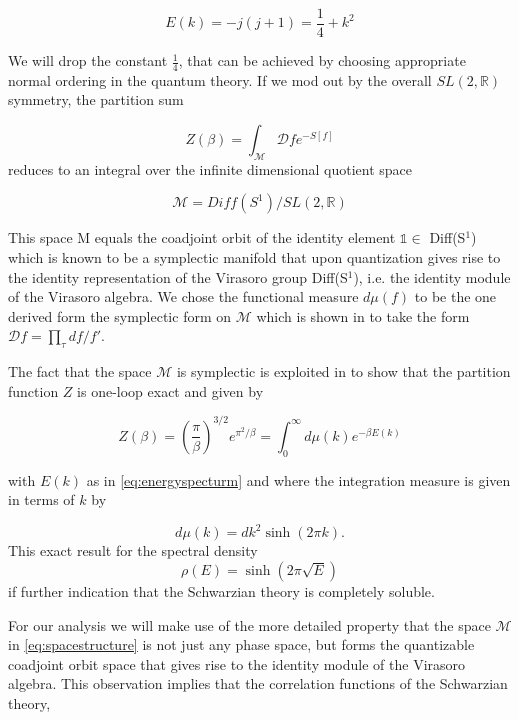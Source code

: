 \begin{equation}
E(k) = -j(j+1) = \frac{1}{4} + k^2
\label{eq:energyspecturm}
\end{equation}

We will drop the constant $\frac{1}{4}$, that can be achieved by choosing appropriate normal ordering in the quantum theory. If we mod out by the overall $SL(2,\mathbb{R})$ symmetry, the partition sum

\begin{equation}
Z(\beta) = \int_\mathcal{M}{\mathcal{D}f e^{-S[f]}}
\end{equation}
reduces to an integral over the infinite dimensional quotient space

\begin{equation}
\mathcal{M} = Diff(S^1)/SL(2,\mathbb{R})	
\label{eq:spacestructure}
\end{equation}

This space M equals the coadjoint orbit of the identity element $\mathbb{1}\in$ Diff(S$^1$) which is known to be a symplectic manifold that upon quantization gives rise to the identity representation
of the Virasoro group Diff(S$^1$), i.e. the identity module of the Virasoro algebra. We chose the functional measure $d\mu(f)$ to be the one derived form the symplectic form on $\mathcal{M}$ which is shown in \cite{Alekseev90}\cite{Bagrets16} to take the form $\mathcal{D}f = \prod_\tau df/f'$.

The fact that the space $\mathcal{M}$ is symplectic is exploited in \cite{Witten17} to show that the partition function $Z$ is one-loop exact and given by

\begin{equation}
Z(\beta) = \left(\frac{\pi}{\beta}\right)^{3/2} e^{\pi^2/\beta} = \int_0^\infty{d\mu(k)e^{-\beta E(k)}}
\end{equation}

with $E(k)$ as in \eqref{eq:energyspecturm} and where the integration measure is given in terms of $k$ by

\begin{equation}
d\mu(k) = dk^2\sinh(2\pi k).
\end{equation}
This exact result for the spectral density 
\begin{equation}
\rho(E) = \sinh(2\pi\sqrt{E})
\label{eq:spectraldensity}
\end{equation}
if further indication that the Schwarzian theory is completely soluble. 

For our analysis we will make use of the more detailed property that the space $\mathcal{M}$ in \eqref{eq:spacestructure} is not just any phase space, but forms the quantizable coadjoint orbit space that gives rise to the identity module of the Virasoro algebra. This observation implies that the correlation functions of the Schwarzian theory,

